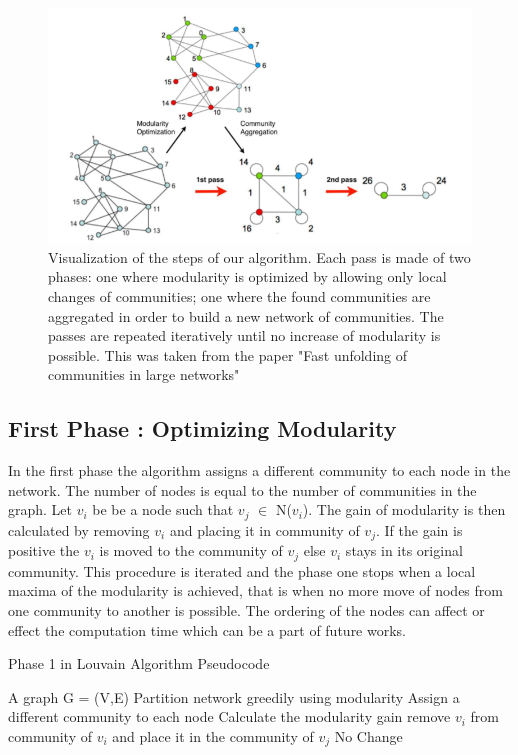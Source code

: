  \begin{figure}[H]

\includegraphics[scale=0.5]{loustep.png}
\caption{\label{loupic} Visualization of the steps of our algorithm. Each pass is made of two phases:
one where modularity is optimized by allowing only local changes of communities;
one where the found communities are aggregated in order to build a new network of
communities. The passes are repeated iteratively until no increase of modularity is
possible. This was taken from the paper "Fast unfolding of communities in large networks" \cite{Louvain}}
\centering
\end{figure}

\subsection{First Phase : Optimizing Modularity}
In the first phase the algorithm assigns a different community to each node in the network.  The number of nodes is equal to the number of communities in the graph. Let $v_i$ be be a node such that $v_j$ $\in$ N($v_i$). The gain of modularity is then calculated by removing $v_i$ and placing it in community of $v_j$. If the gain is positive the $v_i$ is moved to the community of $v_j$ else $v_i$ stays in its original community. This procedure is iterated and the phase one stops when a local maxima of the modularity is achieved, that is when no more move of nodes from one community to another is possible. The ordering of the nodes can affect or effect the computation time which can be a part of future works. 

\begin{algorithm}[H]
\caption{Phase 1 in Louvain Algorithm Pseudocode}
\begin{algorithmic} 
\REQUIRE A graph G = (V,E)
\ENSURE Partition network greedily using modularity
\STATE Assign a different community to each node
\STATE Calculate the modularity gain
\STATE remove $v_i$ from community of $v_i$ and place it in the community of $v_j$
\ELSE 
\STATE No Change
\ENDIF
\ENDFOR
\ENDWHILE
\end{algorithmic}
\end{algorithm}

